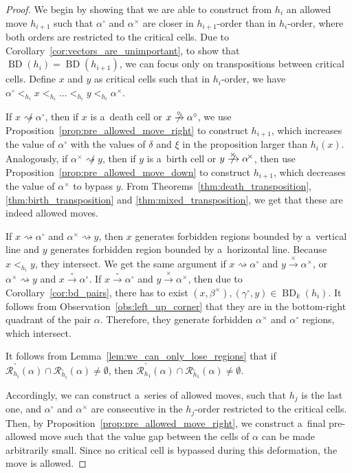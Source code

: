 \documentclass[a4paper,12pt, USenglish,cleveref,autoref,thm-restate]{article}
\newcommand{\mf}{h}
\DeclareMathOperator{\bd}{BD}
\newcommand{\fhR}{\mathcal{R}^\urcorner}
\newcommand{\fcR}{\mathcal{R}^\llcorner}
\newcommand{\cx}{x}
\newcommand{\cy}{y}
\newcommand{\bth}[1]{#1^\circ}
\newcommand{\dth}[1]{#1^{\!\times}}
\newcommand{\homo}{\xrightarrow{\times}}
\newcommand{\nohomo}{\centernot{\xrightarrow{\times}}}
\newcommand{\cohomo}{\xrightarrow{\circ}}
\newcommand{\nocohomo}{\centernot{\xrightarrow{\circ}}}
\newcommand{\bds}{\alpha}
\newcommand{\bdt}{\beta}
\newcommand{\bdb}{\gamma}
\def\pathh#1{\overset{#1}{\rightsquigarrow}}
\def\notpathh#1{\overset{#1}{\not\rightsquigarrow}}
\def\pathh#1{\overset{#1}{\rightsquigarrow}}
\begin{document}
\begin{proof}

    We begin by showing that we are able to construct from $\mf_{i}$ an allowed move $\mf_{i+1}$ such that $\bth\bds$ and $\dth\bds$ are closer in  $\mf_{i+1}$-order than in $\mf_{i}$-order, where both orders are restricted to the critical cells. Due to Corollary~\ref{cor:vectors_are_unimportant}, to show that $\bd(\mf_{i}) = \bd(\mf_{i+1})$, we can focus only on transpositions between critical cells. Define $\cx$ and $\cy$ as critical cells such that in $\mf_{i}$-order, we have $\bth\bds <_{\mf_{i}} \cx <_{\mf_{i}} ... <_{\mf_{i}} \cy <_{\mf_{i}} \dth\bds $. 

    \noindent If $\cx \notpathh{} \bth\bds$, then if $\cx$ is a~death cell or $\cx \nocohomo \bth\bds$, we use Proposition~\ref{prop:pre_allowed_move_right} to construct $\mf_{i+1}$, which increases the value of $\bth\bds$ with the values of $\delta$ and $\xi$ in the proposition larger than $\mf_{i}(\cx)$. Analogously, if $\dth\bds \notpathh{} \cy $, then if $\cy$ is a~birth cell or $\cy \nohomo \dth\bds$, then use Proposition~\ref{prop:pre_allowed_move_down} to construct $\mf_{i+1}$, which decreases the value of $\dth\bds$ to bypass $\cy$. From Theorems~\ref{thm:death_transposition},
    \ref{thm:birth_transposition} and \ref{thm:mixed_transposition}, we get that these are indeed allowed moves.

    \noindent If $\cx \pathh{} \bth\bds$ and $\dth\bds \pathh{} \cy$, then $\cx$ generates forbidden regions bounded by a~vertical line and $\cy$ generates  forbidden region bounded by a~horizontal line. Because $\cx <_{\mf_{i}} \cy$, they intersect.
    We get the same argument if $\cx \pathh{} \bth\bds$ and $\cy \homo \dth\bds$,  or $\dth\bds \pathh{} y$ and $\cx \cohomo \bth\bds$. If $\cx \cohomo \bth\bds$ and $\cy \homo \dth\bds$, then due to Corollary~\ref{cor:bd_pairs}, there has to exist $(x,\dth\bdt), (\bth\bdb,y) \in \bd_{k}(\mf_i)$. It follows from Observation~\ref{obs:left_up_corner} that they are in the bottom-right quadrant of the pair $\bds$. Therefore, they generate forbidden $\dth\bds$ and $\bth\bds$ regions, which intersect.

    \noindent It follows from Lemma~\ref{lem:we_can_only_lose_regions} that if $\fhR_{\mf_{i}}(\bds)\cap\fcR_{\mf_{i}}(\bds) \neq \emptyset$, then $\fhR_{\mf_{1}}(\bds)\cap\fcR_{\mf_{1}}(\bds) \neq \emptyset$.

    \noindent Accordingly, we can construct a~series of allowed moves, such that $\mf_{j}$ is the last one, and $\bth\bds$ and $\dth\bds$ are consecutive in the $\mf_{j}$-order restricted to the critical cells. Then, by Proposition~\ref{prop:pre_allowed_move_right}, we construct a~final pre-allowed move such that the value gap between the cells of $\bds$ can be made arbitrarily small. Since no critical cell is bypassed  during this deformation, the move is allowed.
\end{proof}
\end{document}
